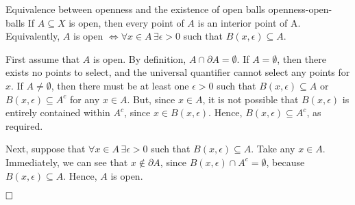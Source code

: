 \documentclass{article}
\renewcommand*\qedsymbol{\hfill\ensuremath{\Box}}
\numberwithin{equation}{section}
\numberwithin{enumi}{section}
\begin{document}
\begin{theorem}{Equivalence between openness and the existence of open balls}
        {openness-open-balls}
    If $ A \subseteq X $ is open, then every point of $ A $ is an interior point
    of A. Equivalently, $ A $ is open $ \iff \forall x \in A\, \exists \epsilon
    > 0 $ such that $ B (x, \epsilon) \subseteq A $.

    First assume that $ A $ is open. By definition, $ A \cap \partial A =
    \emptyset $. If $ A = \emptyset $, then there exists no points to select,
    and the universal quantifier cannot select any points for $ x $. If $ A \neq
    \emptyset $, then there must be at least one $ \epsilon > 0 $ such that $
    B(x, \epsilon) \subseteq A $ or $ B(x, \epsilon) \subseteq A^c $ for any $ x
    \in A $. But, since $ x \in A $, it is not possible that $ B(x, \epsilon) $
    is entirely contained within $ A^c $, since $ x \in B(x, \epsilon) $. Hence,
    $ B(x, \epsilon) \subseteq A^c $, as required.

    Next, suppose that $ \forall x \in A\, \exists \epsilon > 0 $ such that $ B
    (x, \epsilon) \subseteq A $. Take any $ x \in A $. Immediately, we can see
    that $ x \not\in \partial A $, since $ B(x, \epsilon) \cap A^c = \emptyset
    $, because $ B(x, \epsilon) \subseteq A $. Hence, $ A $ is open.

    $ \qedsymbol $
\end{theorem}
\end{document}
